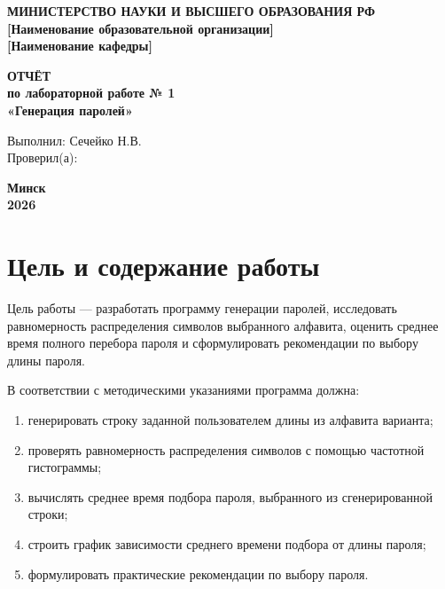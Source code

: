 \documentclass[a4paper,14pt,oneside]{extarticle}
\begin{document}

\begin{titlepage}
\begin{center}
\textbf{МИНИСТЕРСТВО НАУКИ И ВЫСШЕГО ОБРАЗОВАНИЯ РФ}\\
\vspace{0.4cm}
\textbf{[Наименование образовательной организации]}\\
\textbf{[Наименование кафедры]}

\vfill

\textbf{\Large ОТЧЁТ}\\
\vspace{0.4cm}
\textbf{\large по лабораторной работе № 1}\\
\vspace{0.4cm}
\textbf{\large «Генерация паролей»}

\vfill

\begin{flushright}
\begin{minipage}{0.48\textwidth}
Выполнил: Сечейко Н.В.\\
\vspace{0.3cm}
Проверил(а): \underline{\hspace{4cm}}
\end{minipage}
\end{flushright}

\vfill

\textbf{Минск}\\
\textbf{2026}
\end{center}
\end{titlepage}

\tableofcontents
\newpage

\section{Цель и содержание работы}

Цель работы --- разработать программу генерации паролей, исследовать
равномерность распределения символов выбранного алфавита, оценить среднее
время полного перебора пароля и сформулировать рекомендации по выбору длины
пароля.

В соответствии с методическими указаниями программа должна:
\begin{enumerate}
\item генерировать строку заданной пользователем длины из алфавита варианта;
\item проверять равномерность распределения символов с помощью частотной
гистограммы;
\item вычислять среднее время подбора пароля, выбранного из сгенерированной
строки;
\item строить график зависимости среднего времени подбора от длины пароля;
\item формулировать практические рекомендации по выбору пароля.
\end{enumerate}
\end{document}
